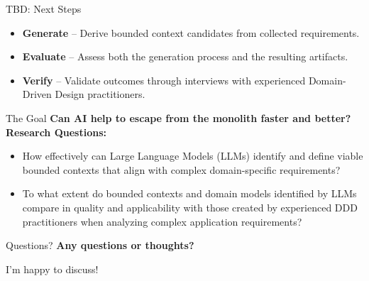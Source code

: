 \documentclass[aspectratio=169,12pt]{beamer}
\begin{document}
\begin{frame}{TBD: Next Steps}
    \begin{itemize}
        \item \textbf{Generate} – Derive bounded context candidates from collected requirements.
        \item \textbf{Evaluate} – Assess both the generation process and the resulting artifacts.
        \item \textbf{Verify} – Validate outcomes through interviews with experienced Domain-Driven Design practitioners.
    \end{itemize}
\end{frame}

\begin{frame}{The Goal}
    \textbf{Can AI help to escape from the monolith faster and better?}
    \textbf{Research Questions:}
    \begin{itemize}
        \item How effectively can Large Language Models (LLMs) identify and define viable bounded contexts that align with complex domain-specific requirements?
        \item To what extent do bounded contexts and domain models identified by LLMs compare in quality and applicability with those created by experienced DDD practitioners when analyzing complex application requirements?
    \end{itemize}
\end{frame}

\begin{frame}{Questions?}
    \centering
    \vspace{2cm}
    \Huge
    \textbf{Any questions or thoughts?}
    
    \vspace{1cm}
    \large
    I’m happy to discuss!
\end{frame}
\end{document}
